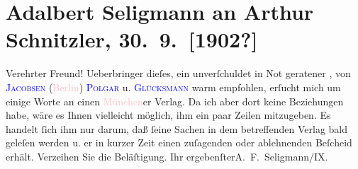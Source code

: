 

               \section[Adalbert Seligmann an Arthur Schnitzler, 30. 9. {[}1902?{]}]{ Adalbert Seligmann an Arthur Schnitzler,
                    30. 9. {[}1902?{]}}\nopagebreak{}\rehead{ }\normalsize\beginnumbering{} \toendnotes[C]{\smallbreak\pagebreak[2]} 
\toendnotes[C]{\smallbreak}\pstart
           \noindent{}{\pb}Verehrter Freund!
                    Ueberbringer dieſes, ein unverſchuldet in Not geratener \label{K_L01236_1v}\label{K_L01236_1h}, von \textcolor{blue}{\textsc{Jacobsen}}{}\ledrightnote{\textcolor{blue}{Siegfried Jacobsohn}} (\textcolor{pink}{Berlin}{}\ledrightnote{\textcolor{pink}{Berlin}}) \textcolor{blue}{\textsc{Polgar}}{}\ledrightnote{\textcolor{blue}{Alfred Polgar}} u. \textcolor{blue}{\textsc{Glücksmann}}{}\ledrightnote{\textcolor{blue}{Heinrich Glücksmann}} warm empfohlen, erſucht mich um
                    einige Worte an einen \textcolor{pink}{München}{}\ledrightnote{\textcolor{pink}{München}}er Verlag. Da
                    ich aber dort keine Beziehungen habe, wäre es Ihnen vielleicht möglich, ihm ein
                        {\pb}paar Zeilen mitzugeben. Es
                    handelt ſich ihm nur darum, daß ſeine Sachen in dem betreffenden Verlag bald
                    geleſen werden u. er in kurzer Zeit einen zuſagenden oder ablehnenden Beſcheid
                    erhält. Verzeihen Sie die Beläſtigung.\pend
           \pstart Ihr ergebenſter\spacefill\mbox{A. F. Seligmann}\pend{}/IX.\pend
           \endnumbering{}  
      